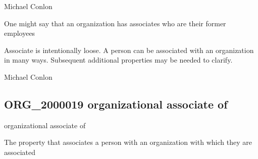 \documentclass[letterpaper,10pt,english]{sphinxmanual}
\begin{document}
\begin{sphinxShadowBox}

\sphinxAtStartPar
Michael Conlon 
\end{sphinxShadowBox}

\begin{sphinxShadowBox}

\sphinxAtStartPar
One might say that an organization has associates who are their former employees
\end{sphinxShadowBox}

\begin{sphinxShadowBox}

\sphinxAtStartPar
Associate is intentionally loose.  A person can be associated with an organization in many ways.  Subsequent additional properties may be needed to clarify.
\end{sphinxShadowBox}

\begin{sphinxShadowBox}

\sphinxAtStartPar
Michael Conlon 
\end{sphinxShadowBox}
\begin{quote}

\ignorespaces \end{quote}


\subsection{ORG\_2000019 \sphinxhyphen{} organizational associate of}
\label{\detokenize{doc-ORG_2000019:org-2000019-organizational-associate-of}}\label{\detokenize{doc-ORG_2000019:index-0}}\label{\detokenize{doc-ORG_2000019::doc}}
\begin{sphinxShadowBox}

\sphinxAtStartPar
organizational associate of
\end{sphinxShadowBox}

\begin{sphinxShadowBox}

\sphinxAtStartPar
The property that associates a person with an organization with which they are associated
\end{sphinxShadowBox}
\end{document}
